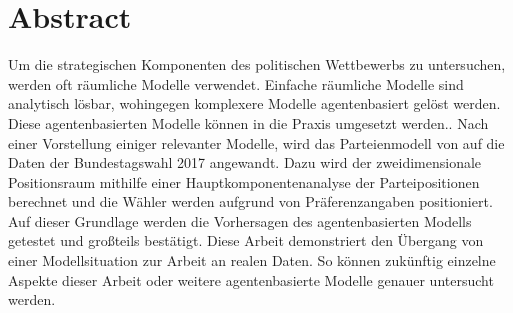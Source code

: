 \documentclass[oneside,12pt,a4paper]{report}
\begin{document}
\section*{Abstract}


Um die strategischen Komponenten des politischen Wettbewerbs zu untersuchen, werden oft räumliche Modelle verwendet.
Einfache räumliche Modelle sind analytisch lösbar, wohingegen komplexere Modelle agentenbasiert gelöst werden.
Diese agentenbasierten Modelle können in die Praxis umgesetzt werden..
Nach einer Vorstellung einiger relevanter Modelle, wird das Parteienmodell von \citet{laver2005policy} auf die Daten der Bundestagswahl 2017 angewandt.
Dazu wird der zweidimensionale Positionsraum mithilfe einer Hauptkomponentenanalyse der Parteipositionen berechnet und die Wähler werden aufgrund von Präferenzangaben positioniert.
Auf dieser Grundlage werden die Vorhersagen des agentenbasierten Modells getestet und großteils bestätigt.
Diese Arbeit demonstriert den Übergang von einer Modellsituation zur Arbeit an realen Daten. So können zukünftig einzelne Aspekte dieser Arbeit oder weitere agentenbasierte Modelle genauer untersucht werden.
\end{document}
